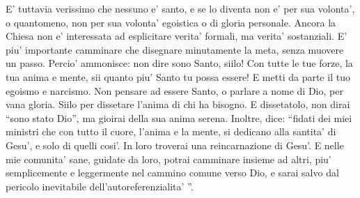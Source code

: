 E' tuttavia verissimo che nessuno e' santo,
e se lo diventa non e' per sua volonta',
o quantomeno, non per sua volonta' egoistica o 
di gloria personale.
Ancora la Chiesa non e' interessata ad esplicitare
verita' formali, ma verita' sostanziali.
E' piu' importante camminare che disegnare 
minutamente la meta, senza muovere un passo.
Percio' ammonisce: non dire sono Santo, siilo! 
Con tutte le tue forze, la tua anima e mente, sii 
quanto piu' Santo tu possa essere! E metti
da parte il tuo egoismo e narcismo.
Non pensare ad essere Santo, o parlare a nome di Dio,
per vana gloria. Siilo per dissetare l'anima 
di chi ha bisogno. E dissetatolo, 
non dirai ``sono stato Dio'', ma 
gioirai della sua anima serena.
Inoltre, dice: ``fidati dei miei ministri che con tutto
il cuore, l'anima e la mente, si dedicano alla santita'
di Gesu', e solo di quelli cosi'.
In loro troverai una reincarnazione di Gesu'.
E nelle mie comunita' sane, guidate da loro, potrai 
camminare insieme ad altri, piu' semplicemente e
leggermente nel cammino comune verso Dio, 
e sarai salvo dal pericolo inevitabile
dell'autoreferenzialita' ''.
